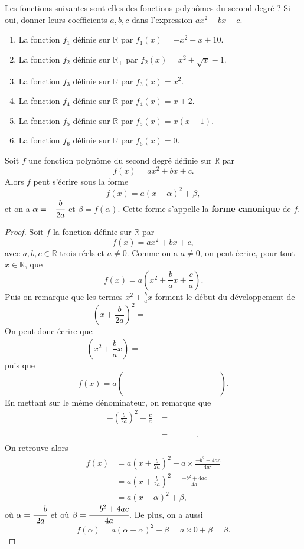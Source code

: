 \documentclass[11pt]{article}
\begin{document}
\begin{exemple}
  Les fonctions suivantes sont-elles des fonctions polynômes du second degré ?
  Si oui, donner leurs coefficients $a, b, c$ dans l'expression $ax^2+bx+c$.
  \begin{enumerate}
    \item La fonction $f_1$ définie sur $\mathbb{R}$ par $f_1(x) = -x^2-x+10$.
    \item La fonction $f_2$ définie sur $\mathbb{R_+}$ par $f_2(x) = x^2+\sqrt x-1$.
    \item La fonction $f_3$ définie sur $\mathbb{R}$ par $f_3(x) = x^2$.
    \item La fonction $f_4$ définie sur $\mathbb{R}$ par $f_4(x) = x+2$.
    \item La fonction $f_5$ définie sur $\mathbb{R}$ par $f_5(x) = x(x+1)$.
    \item La fonction $f_6$ définie sur $\mathbb{R}$ par $f_6(x) = 0$.
  \end{enumerate}
\end{exemple}

\begin{prop}
  Soit $f$ une fonction polynôme du second degré définie sur $\mathbb{R}$ par
  \[
    f(x) = ax^2+bx+c.
  \]
  Alors $f$ peut s'écrire sous la forme
  \[
    f(x) = a(x-\alpha)^2+\beta,
  \]
  et on a $\alpha=-\cfrac{b}{2a}$ et $\beta=f(\alpha)$. Cette forme s'appelle la
  \textbf{forme canonique} de $f$.
\end{prop}

\begin{proof}
  Soit $f$ la fonction définie sur $\mathbb{R}$ par
  \[
    f(x) = ax^2+bx+c,
  \]
  avec $a,b,c\in\mathbb{R}$ trois réels et $a\neq0$. Comme on a $a\neq0$, on
  peut écrire, pour tout $x\in\mathbb{R}$, que
  \[
    f(x) = a\left( x^2+\frac{b}{a}x+\frac{c}{a} \right).
  \]
  Puis on remarque que les termes $x^2+\frac{b}{a}x$ forment le début du
  développement de
  \[
    \left(x+\frac{b}{2a}\right)^2 = \phantom{x^2 +
      \frac{b}{a}x+\left(\frac{b}{2a}\right)^2.}
  \]
  On peut donc écrire que
  \[
    \left( x^2+\frac{b}{a}x \right) = \phantom{\left( x+\frac{b}{2a} \right)^2-\left(
    \frac{b}{2a} \right)^2}
  \]
  puis que
  \[
    f(x) = a\left(\phantom{ \left( x+\frac{b}{2a} \right)^2-\left( \frac{b}{2a}
    \right)^2+\frac{c}{a}} \right).
  \]
  En mettant sur le même dénominateur, on remarque que
  \begin{align*}
    -\left( \frac{b}{2a} \right)^2+\frac{c}{a} &= \phantom{-\frac{b^2}{4a^2} +
    \frac{c}{a}} \\
    &= \phantom{\frac{-b^2+4ac}{4a^2}}.
 \end{align*}
 On retrouve alors
 \begin{align*}
   f(x) &= a\left( x+\frac{b}{2a} \right)^2+a\times\frac{-b^2+4ac}{4a^2} \\
   &= a\left( x+\frac{b}{2a} \right)^2+\frac{-b^2+4ac}{4a} \\
   &= a\left( x-\alpha \right)^2+\beta,
 \end{align*}
 où $\alpha=\cfrac{-b}{2a}$ et où $\beta=\cfrac{-b^2+4ac}{4a}$. De plus, on a
 aussi 
 \[
   f(\alpha) = a\left( \alpha-\alpha \right)^2+\beta= a\times 0+\beta=\beta.
 \]
\end{proof}
\end{document}
